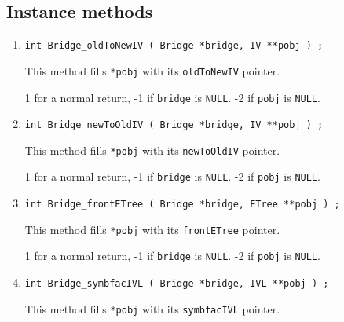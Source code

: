 \subsection{Instance methods}
\label{subsection:Bridge:proto:instance}
\par
\begin{enumerate}
\item
\begin{verbatim}
int Bridge_oldToNewIV ( Bridge *bridge, IV **pobj ) ;
\end{verbatim}
This method fills \texttt{*pobj} with its \texttt{oldToNewIV} pointer.
\par {}
1 for a normal return, 
-1 if \texttt{bridge} is \texttt{NULL}.
-2 if \texttt{pobj} is \texttt{NULL}.
\item
\begin{verbatim}
int Bridge_newToOldIV ( Bridge *bridge, IV **pobj ) ;
\end{verbatim}
This method fills \texttt{*pobj} with its \texttt{newToOldIV} pointer.
\par {}
1 for a normal return, 
-1 if \texttt{bridge} is \texttt{NULL}.
-2 if \texttt{pobj} is \texttt{NULL}.
\item
\begin{verbatim}
int Bridge_frontETree ( Bridge *bridge, ETree **pobj ) ;
\end{verbatim}
This method fills \texttt{*pobj} with its \texttt{frontETree} pointer.
\par {}
1 for a normal return, 
-1 if \texttt{bridge} is \texttt{NULL}.
-2 if \texttt{pobj} is \texttt{NULL}.
\item
\begin{verbatim}
int Bridge_symbfacIVL ( Bridge *bridge, IVL **pobj ) ;
\end{verbatim}
This method fills \texttt{*pobj} with its \texttt{symbfacIVL} pointer.
\par {}

\end{enumerate}
